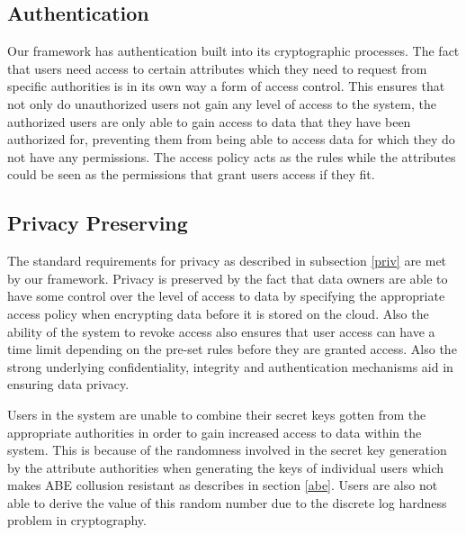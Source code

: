 \subsection*{Authentication}

Our framework has authentication built into its cryptographic processes. The fact that users need access to certain attributes which they need to request from specific authorities is in its own way a form of access control. This ensures that not only do unauthorized users not gain any level of access to the system, the authorized users are only able to gain access to data that they have been authorized for, preventing them from being able to access data for which they do not have any permissions. The access policy acts as the rules while the attributes could be seen as the permissions that grant users access if they fit.

\subsection*{Privacy Preserving}

The standard requirements for privacy as described in subsection \ref{priv} are met by our framework. Privacy is preserved by the fact that data owners are able to have some control over the level of access to data by specifying the appropriate access policy when encrypting data before it is stored on the cloud. Also the ability of the system to revoke access also ensures that user access can have a time limit depending on the pre-set rules before they are granted access. Also the strong underlying confidentiality, integrity and authentication mechanisms aid in ensuring data privacy.

Users in the system are unable to combine their secret keys gotten from the appropriate authorities in order to gain increased access to data within the system. This is because of the randomness involved in the secret key generation by the attribute authorities when generating the keys of individual users which makes ABE collusion resistant as describes in section \ref{abe}. Users are also not able to derive the value of this random number due to the discrete log hardness problem in cryptography.